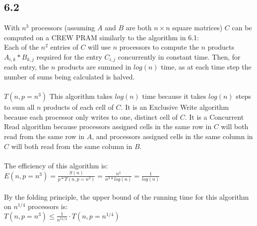 \documentclass[letterpaper,notitlepage,twoside]{article}
\begin{document}
\subsection*{6.2}
With $n^3$ processors (assuming $A$ and $B$ are both $n \times n$ square matrices) $C$ can be computed on a CREW PRAM similarly to the algorithm in 6.1:\\ 
Each of the $n^2$ entries of $C$ will use $n$ processors to compute the $n$ products $A_{i, k} * B_{k, j}$ required for the entry $C_{i, j}$ concurrently in constant time. Then, for each entry,  the $n$ products are summed in $log(n)$ time, as at each time step the number of sums being calculated is halved.  \\\\
$T(n, p = n^3)$ This algorithm takes $log(n)$ time because it takes $log(n)$ steps to sum all $n$ products of each cell of $C$. It is an Exclusive Write algorithm because each processor only writes to one, distinct cell of $C$. It is a Concurrent Read algorithm because processors assigned cells in the same row in $C$ will both read from the same row in $A$, and processors assigned cells in the same column in $C$ will both read from the same column in $B$. \\\\
The efficiency of this algorithm is: $E(n, p=n^3) = \frac{S(n)}{p * T(n, p = n^3)} = \frac{n^3}{n^3 * log(n)} = \frac{1}{log(n)}$\\\\
By the folding principle, the upper bound of the running time for this algorithm on $n^{1/4}$ processors is:\\
$T(n, p = n^3) \leq \frac{1}{n^{11/4}} \cdot T(n, p = n^{1/4})$
\end{document}
